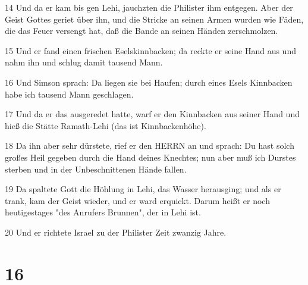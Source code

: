 \par 14 Und da er kam bis gen Lehi, jauchzten die Philister ihm entgegen. Aber der Geist Gottes geriet über ihn, und die Stricke an seinen Armen wurden wie Fäden, die das Feuer versengt hat, daß die Bande an seinen Händen zerschmolzen.
\par 15 Und er fand einen frischen Eselskinnbacken; da reckte er seine Hand aus und nahm ihn und schlug damit tausend Mann.
\par 16 Und Simson sprach: Da liegen sie bei Haufen; durch eines Esels Kinnbacken habe ich tausend Mann geschlagen.
\par 17 Und da er das ausgeredet hatte, warf er den Kinnbacken aus seiner Hand und hieß die Stätte Ramath-Lehi (das ist Kinnbackenhöhe).
\par 18 Da ihn aber sehr dürstete, rief er den HERRN an und sprach: Du hast solch großes Heil gegeben durch die Hand deines Knechtes; nun aber muß ich Durstes sterben und in der Unbeschnittenen Hände fallen.
\par 19 Da spaltete Gott die Höhlung in Lehi, das Wasser herausging; und als er trank, kam der Geist wieder, und er ward erquickt. Darum heißt er noch heutigestages "des Anrufers Brunnen", der in Lehi ist.
\par 20 Und er richtete Israel zu der Philister Zeit zwanzig Jahre.

\chapter{16}

